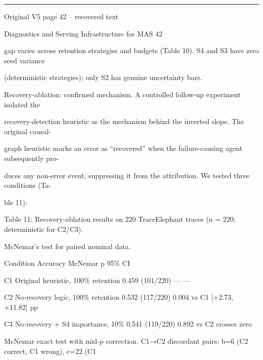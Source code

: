\par\smallskip\noindent\rule{\textwidth}{0.4pt}\par{\sffamily\footnotesize Original V5 page 42 -- recovered text}\par\begin{flushleft}\footnotesize\ttfamily
\par\smallskip
\par\smallskip
\noindent Diagnostics and Serving Infrastructure for MAS 42\par
\par\smallskip
\par\smallskip
\par\smallskip
\noindent gap varies across retention strategies and budgets (Table 10). S4 and S3 have zero seed variance\par
\noindent (deterministic strategies); only S2 has genuine uncertainty bars.\par
\par\smallskip
\noindent Recovery-ablation: confirmed mechanism. A controlled follow-up experiment isolated the\par
\noindent recovery-detection heuristic as the mechanism behind the inverted slope. The original causal-\par
\noindent graph heuristic marks an error as “recovered” when the failure-causing agent subsequently pro-\par
\noindent duces any non-error event, suppressing it from the attribution. We tested three conditions (Ta-\par
\noindent ble 11):\par
\par\smallskip
\noindent Table 11: Recovery-ablation results on 220 TraceElephant traces (n = 220; deterministic for C2/C3).\par
\noindent McNemar’s test for paired nominal data.\par
\par\smallskip
\noindent  Condition Accuracy McNemar p 95\% CI\par
\noindent  C1 Original heuristic, 100\% retention 0.459 (101/220) — —\par
\noindent  C2 No-recovery logic, 100\% retention 0.532 (117/220) 0.004 vs C1 [+2.73, +11.82] pp\par
\noindent  C3 No-recovery + S4 importance, 10\% 0.541 (119/220) 0.892 vs C2 crosses zero\par
\noindent  McNemar exact test with mid-p correction. C1→C2 discordant pairs: b=6 (C2 correct, C1 wrong), c=22 (C1\par

\end{flushleft}
